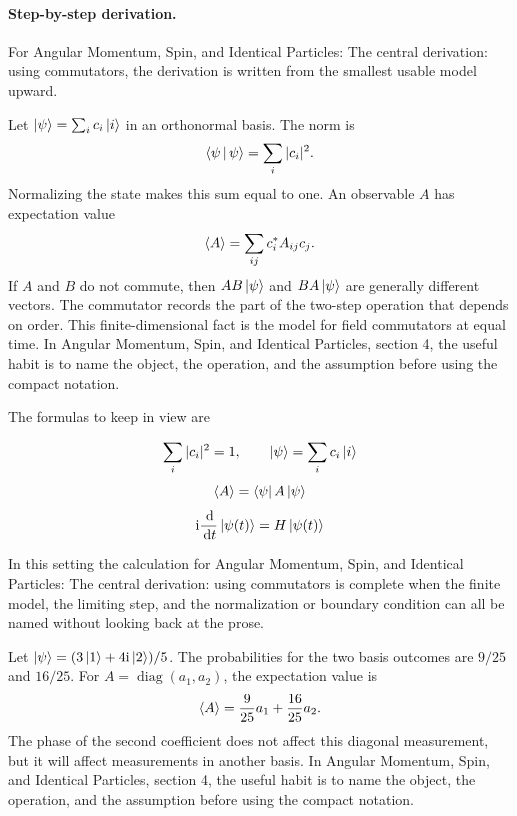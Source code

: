 \paragraph{Step-by-step derivation.}

For Angular Momentum, Spin, and Identical Particles: The central derivation: using commutators, the derivation is written from the smallest usable model upward.

Let \(\left|\psi\right\rangle=\sum_i c_i\left|i\right\rangle\) in an orthonormal basis.  The norm is
\[
  \left\langle \psi\,\middle|\,\psi\right\rangle=\sum_i |c_i|^2.
\]
Normalizing the state makes this sum equal to one.  An observable \(A\) has expectation value
\[
  \left\langle A\right\rangle=\sum_{ij}c_i^*A_{ij}c_j.
\]
If \(A\) and \(B\) do not commute, then \(AB\left|\psi\right\rangle\) and \(BA\left|\psi\right\rangle\) are generally different vectors.  The commutator records the part of the two-step operation that depends on order.  This finite-dimensional fact is the model for field commutators at equal time.  In Angular Momentum, Spin, and Identical Particles, section 4, the useful habit is to name the object, the operation, and the assumption before using the compact notation.

The formulas to keep in view are

\[
  \sum_i |c_i|^2=1,\qquad \left|\psi\right\rangle=\sum_i c_i\left|i\right\rangle
\]
\[
  \left\langle A\right\rangle=\left\langle \psi\right|A\left|\psi\right\rangle
\]
\[
  \mathrm i\frac{\,\mathrm d}{\,\mathrm d t}\left|\psi(t)\right\rangle=H\left|\psi(t)\right\rangle
\]

In this setting the calculation for Angular Momentum, Spin, and Identical Particles: The central derivation: using commutators is complete when the finite model, the limiting step, and the normalization or boundary condition can all be named without looking back at the prose.




\begin{example}
Let \(\left|\psi\right\rangle=(3\left|1\right\rangle+4\mathrm i\left|2\right\rangle)/5\).  The probabilities for the two basis outcomes are \(9/25\) and \(16/25\).  For \(A=\operatorname{diag}(a_1,a_2)\), the expectation value is
\[
  \left\langle A\right\rangle=\frac{9}{25}a_1+\frac{16}{25}a_2.
\]
The phase of the second coefficient does not affect this diagonal measurement, but it will affect measurements in another basis.  In Angular Momentum, Spin, and Identical Particles, section 4, the useful habit is to name the object, the operation, and the assumption before using the compact notation.
\end{example}




